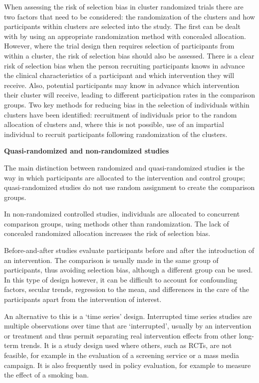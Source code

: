 \documentclass[
  10pt,
  a4paper,
  DIV=11,
  numbers=noendperiod]{scrreprt}
\begin{document}
When assessing the risk of selection bias in cluster randomized trials
there are two factors that need to be considered: the randomization of
the clusters and how participants within clusters are selected into the
study. The first can be dealt with by using an appropriate randomization
method with concealed allocation. However, where the trial design then
requires selection of participants from within a cluster, the risk of
selection bias should also be assessed. There is a clear risk of
selection bias when the person recruiting participants knows in advance
the clinical characteristics of a participant and which intervention
they will receive. Also, potential participants may know in advance
which intervention their cluster will receive, leading to different
participation rates in the comparison groups. Two key methods for
reducing bias in the selection of individuals within clusters have been
identified: recruitment of individuals prior to the random allocation of
clusters and, where this is not possible, use of an impartial individual
to recruit participants following randomization of the clusters.

\textbf{Quasi-randomized and non-randomized studies}

The main distinction between randomized and quasi-randomized studies is
the way in which participants are allocated to the intervention and
control groups; quasi-randomized studies do not use random assignment to
create the comparison groups.

In non-randomized controlled studies, individuals are allocated to
concurrent comparison groups, using methods other than randomization.
The lack of concealed randomized allocation increases the risk of
selection bias.

Before-and-after studies evaluate participants before and after the
introduction of an intervention. The comparison is usually made in the
same group of participants, thus avoiding selection bias, although a
different group can be used. In this type of design however, it can be
difficult to account for confounding factors, secular trends, regression
to the mean, and differences in the care of the participants apart from
the intervention of interest.

An alternative to this is a `time series' design. Interrupted time
series studies are multiple observations over time that are
`interrupted', usually by an intervention or treatment and thus permit
separating real intervention effects from other long-term trends. It is
a study design used where others, such as RCTs, are not feasible, for
example in the evaluation of a screening service or a mass media
campaign. It is also frequently used in policy evaluation, for example
to measure the effect of a smoking ban.
\end{document}
